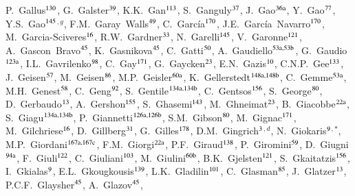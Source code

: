 \begin{flushleft}
P.~Gallus$^\textrm{\scriptsize 130}$,
G.~Galster$^\textrm{\scriptsize 39}$,
K.K.~Gan$^\textrm{\scriptsize 113}$,
S.~Ganguly$^\textrm{\scriptsize 37}$,
J.~Gao$^\textrm{\scriptsize 36a}$,
Y.~Gao$^\textrm{\scriptsize 77}$,
Y.S.~Gao$^\textrm{\scriptsize 145}$$^{,g}$,
F.M.~Garay~Walls$^\textrm{\scriptsize 49}$,
C.~Garc\'ia$^\textrm{\scriptsize 170}$,
J.E.~Garc\'ia~Navarro$^\textrm{\scriptsize 170}$,
M.~Garcia-Sciveres$^\textrm{\scriptsize 16}$,
R.W.~Gardner$^\textrm{\scriptsize 33}$,
N.~Garelli$^\textrm{\scriptsize 145}$,
V.~Garonne$^\textrm{\scriptsize 121}$,
A.~Gascon~Bravo$^\textrm{\scriptsize 45}$,
K.~Gasnikova$^\textrm{\scriptsize 45}$,
C.~Gatti$^\textrm{\scriptsize 50}$,
A.~Gaudiello$^\textrm{\scriptsize 53a,53b}$,
G.~Gaudio$^\textrm{\scriptsize 123a}$,
I.L.~Gavrilenko$^\textrm{\scriptsize 98}$,
C.~Gay$^\textrm{\scriptsize 171}$,
G.~Gaycken$^\textrm{\scriptsize 23}$,
E.N.~Gazis$^\textrm{\scriptsize 10}$,
C.N.P.~Gee$^\textrm{\scriptsize 133}$,
J.~Geisen$^\textrm{\scriptsize 57}$,
M.~Geisen$^\textrm{\scriptsize 86}$,
M.P.~Geisler$^\textrm{\scriptsize 60a}$,
K.~Gellerstedt$^\textrm{\scriptsize 148a,148b}$,
C.~Gemme$^\textrm{\scriptsize 53a}$,
M.H.~Genest$^\textrm{\scriptsize 58}$,
C.~Geng$^\textrm{\scriptsize 92}$,
S.~Gentile$^\textrm{\scriptsize 134a,134b}$,
C.~Gentsos$^\textrm{\scriptsize 156}$,
S.~George$^\textrm{\scriptsize 80}$,
D.~Gerbaudo$^\textrm{\scriptsize 13}$,
A.~Gershon$^\textrm{\scriptsize 155}$,
S.~Ghasemi$^\textrm{\scriptsize 143}$,
M.~Ghneimat$^\textrm{\scriptsize 23}$,
B.~Giacobbe$^\textrm{\scriptsize 22a}$,
S.~Giagu$^\textrm{\scriptsize 134a,134b}$,
P.~Giannetti$^\textrm{\scriptsize 126a,126b}$,
S.M.~Gibson$^\textrm{\scriptsize 80}$,
M.~Gignac$^\textrm{\scriptsize 171}$,
M.~Gilchriese$^\textrm{\scriptsize 16}$,
D.~Gillberg$^\textrm{\scriptsize 31}$,
G.~Gilles$^\textrm{\scriptsize 178}$,
D.M.~Gingrich$^\textrm{\scriptsize 3}$$^{,d}$,
N.~Giokaris$^\textrm{\scriptsize 9}$$^{,*}$,
M.P.~Giordani$^\textrm{\scriptsize 167a,167c}$,
F.M.~Giorgi$^\textrm{\scriptsize 22a}$,
P.F.~Giraud$^\textrm{\scriptsize 138}$,
P.~Giromini$^\textrm{\scriptsize 59}$,
D.~Giugni$^\textrm{\scriptsize 94a}$,
F.~Giuli$^\textrm{\scriptsize 122}$,
C.~Giuliani$^\textrm{\scriptsize 103}$,
M.~Giulini$^\textrm{\scriptsize 60b}$,
B.K.~Gjelsten$^\textrm{\scriptsize 121}$,
S.~Gkaitatzis$^\textrm{\scriptsize 156}$,
I.~Gkialas$^\textrm{\scriptsize 9}$,
E.L.~Gkougkousis$^\textrm{\scriptsize 139}$,
L.K.~Gladilin$^\textrm{\scriptsize 101}$,
C.~Glasman$^\textrm{\scriptsize 85}$,
J.~Glatzer$^\textrm{\scriptsize 13}$,
P.C.F.~Glaysher$^\textrm{\scriptsize 45}$,
A.~Glazov$^\textrm{\scriptsize 45}$,
$$
\end{flushleft}
